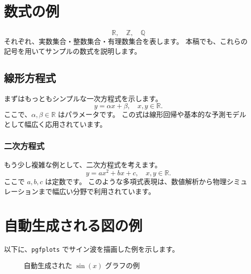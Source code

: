 \documentclass[a4paper,10.5pt]{ltjsarticle}
\begin{document}
\section{数式の例}
\[
  \mathbb{R}, \quad \mathbb{Z}, \quad \mathbb{Q}
\]
それぞれ、実数集合・整数集合・有理数集合を表します。
本稿でも、これらの記号を用いてサンプルの数式を説明します。

\subsection{線形方程式}
まずはもっともシンプルな一次方程式を示します。
\begin{equation}
  y = \alpha x + \beta, \quad x, y \in \mathbb{R}.
  \label{eq:lin}
\end{equation}
ここで、$\alpha, \beta \in \mathbb{R}$ はパラメータです。
この式は線形回帰や基本的な予測モデルとして幅広く応用されています。

\subsubsection{二次方程式}
もう少し複雑な例として、二次方程式を考えます。
\begin{equation}
  y = ax^2 + bx + c, \quad x, y \in \mathbb{R}.
\end{equation}
ここで $a, b, c$ は定数です。  
このような多項式表現は、数値解析から物理シミュレーションまで幅広い分野で利用されています。

\clearpage
\section{自動生成される図の例}
以下に、\texttt{pgfplots} でサイン波を描画した例を示します。

\begin{figure}[h]
\centering
{}
\caption{自動生成された $\sin(x)$ グラフの例}
\label{fig:sin}
\end{figure}
\end{document}
